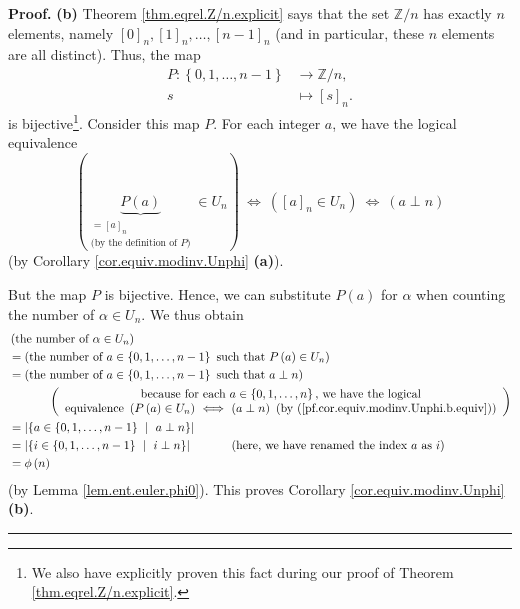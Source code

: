 \documentclass[numbers=enddot,12pt,final,onecolumn,notitlepage]{scrartcl}%
\numberwithin{exer}{subsection}
\theoremstyle{definition}
\newenvironment{proof}[1][Proof]{\noindent\textbf{#1.} }{\ \rule{0.5em}{0.5em}}
\begin{document}
\begin{proof}
\textbf{(b)} Theorem \ref{thm.eqrel.Z/n.explicit} says that the set
$\mathbb{Z}/n$ has exactly $n$ elements, namely \newline$\left[  0\right]
_{n},\left[  1\right]  _{n},\ldots,\left[  n-1\right]  _{n}$ (and in
particular, these $n$ elements are all distinct). Thus, the map%
\begin{align*}
P:\left\{  0,1,\ldots,n-1\right\}   &  \rightarrow\mathbb{Z}/n,\\
s  &  \mapsto\left[  s\right]  _{n}.
\end{align*}
is bijective\footnote{We also have explicitly proven this fact during our
proof of Theorem \ref{thm.eqrel.Z/n.explicit}.}. Consider this map $P$. For
each integer $a$, we have the logical equivalence%
\begin{equation}
\left(  \underbrace{P\left(  a\right)  }_{\substack{=\left[  a\right]
_{n}\\\text{(by the definition of }P\text{)}}}\in U_{n}\right)
\ \Longleftrightarrow\ \left(  \left[  a\right]  _{n}\in U_{n}\right)
\ \Longleftrightarrow\ \left(  a\perp n\right)
\label{pf.cor.equiv.modinv.Unphi.b.equiv}%
\end{equation}
(by Corollary \ref{cor.equiv.modinv.Unphi} \textbf{(a)}).

But the map $P$ is bijective. Hence, we can substitute $P\left(  a\right)  $
for $\alpha$ when counting the number of $\alpha\in U_{n}$. We thus obtain%
\begin{align*}
&  \left(  \text{the number of }\alpha\in U_{n}\right) \\
&  =\left(  \text{the number of }a\in\left\{  0,1,\ldots,n-1\right\}  \text{
such that }P\left(  a\right)  \in U_{n}\right) \\
&  =\left(  \text{the number of }a\in\left\{  0,1,\ldots,n-1\right\}  \text{
such that }a\perp n\right) \\
&  \ \ \ \ \ \ \ \ \ \ \left(
\begin{array}
[c]{c}%
\text{because for each }a\in\left\{  0,1,\ldots,n\right\}  \text{, we have the
logical}\\
\text{equivalence }\left(  P\left(  a\right)  \in U_{n}\right)
\ \Longleftrightarrow\ \left(  a\perp n\right)  \text{ (by
(\ref{pf.cor.equiv.modinv.Unphi.b.equiv}))}%
\end{array}
\right) \\
&  =\left\vert \left\{  a\in\left\{  0,1,\ldots,n-1\right\}  \ \mid\ a\perp
n\right\}  \right\vert \\
&  =\left\vert \left\{  i\in\left\{  0,1,\ldots,n-1\right\}  \ \mid\ i\perp
n\right\}  \right\vert \ \ \ \ \ \ \ \ \ \ \left(  \text{here, we have renamed
the index }a\text{ as }i\right) \\
&  =\phi\left(  n\right)
\end{align*}
(by Lemma \ref{lem.ent.euler.phi0}). This proves Corollary
\ref{cor.equiv.modinv.Unphi} \textbf{(b)}.
\end{proof}
\end{document}

